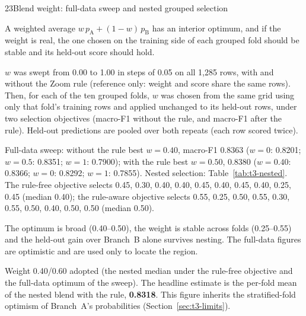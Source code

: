 \begin{explog}{23}{Blend weight: full-data sweep and nested grouped selection}
\item[Hypothesis] A weighted average $w\,p_\mathrm{A}+(1-w)\,p_\mathrm{B}$ has an interior
optimum, and if the weight is real, the one chosen on the training side of each
grouped fold should be stable and its held-out score should hold.
\item[Method] $w$ was swept from 0.00 to 1.00 in steps of 0.05 on all 1{,}285 rows, with
and without the Zoom rule (reference only: weight and score share the same rows).
Then, for each of the ten grouped folds, $w$ was chosen from the same grid using only
that fold's training rows and applied unchanged to its held-out rows, under two
selection objectives (macro-F1 without the rule, and macro-F1 after the rule).
Held-out predictions are pooled over both repeats (each row scored twice).
\item[Result] Full-data sweep: without the rule best $w=0.40$, macro-F1 0.8363 ($w=0$:
0.8201; $w=0.5$: 0.8351; $w=1$: 0.7900); with the rule best $w=0.50$, 0.8380
($w=0.40$: 0.8366; $w=0$: 0.8292; $w=1$: 0.7855). Nested selection:
Table~\ref{tab:t3-nested}. The rule-free objective selects 0.45, 0.30, 0.40, 0.40,
0.45, 0.40, 0.45, 0.40, 0.25, 0.45 (median 0.40); the rule-aware objective selects
0.55, 0.25, 0.50, 0.55, 0.30, 0.55, 0.50, 0.40, 0.50, 0.50 (median 0.50).
\item[Inference] The optimum is broad (0.40--0.50), the weight is stable across folds
(0.25--0.55) and the held-out gain over Branch~B alone survives nesting. The
full-data figures are optimistic and are used only to locate the region.
\item[Verdict] Weight 0.40/0.60 adopted (the nested median under the rule-free objective
and the full-data optimum of the sweep). The headline estimate is the per-fold mean
of the nested blend with the rule, \textbf{0.8318}. This figure inherits the stratified-fold optimism of Branch~A's probabilities (Section~\ref{sec:t3-limits}).
\end{explog}

